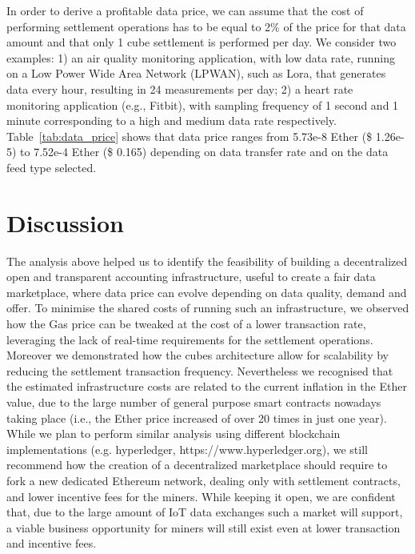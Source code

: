In order to derive a profitable data price, we can assume that the cost of performing settlement operations has to be equal to 2\% of the price for that data amount and that only 1 cube settlement is performed per day. We consider two examples: 1) an air quality monitoring application, with low data rate, running on a Low Power Wide Area Network (LPWAN), such as Lora, that generates data every hour, resulting in 24 measurements per day; 2) a heart rate monitoring application (e.g., Fitbit), with sampling frequency of 1 second and 1 minute corresponding to a high and medium data rate respectively.  
Table~\ref{tab:data_price} shows that data price ranges from 5.73e-8 Ether (\$ 1.26e-5) to 7.52e-4 Ether (\$ 0.165) depending on data transfer rate and on the data feed type selected. 

\section{Discussion}
\label{sec:discussion}
The analysis above helped us to identify the feasibility of building a decentralized open and transparent accounting infrastructure, useful to create a fair data marketplace, where data price can evolve depending on data quality, demand and offer. To minimise the shared costs of running such an infrastructure, we observed how the Gas price can be tweaked at the cost of a lower transaction rate, leveraging the lack of real-time requirements for the settlement operations. Moreover we demonstrated how the cubes architecture allow for scalability by reducing the settlement transaction frequency.
Nevertheless we recognised that the estimated infrastructure costs are related to the current inflation in the Ether value, due to the large number of general purpose smart contracts nowadays taking place (i.e., the Ether price increased of over 20 times in just one year). While we plan to perform similar analysis using different blockchain implementations (e.g. hyperledger, https://www.hyperledger.org), we still recommend how the creation of a decentralized marketplace should require to fork a new dedicated Ethereum network, dealing only with settlement contracts, and lower incentive fees for the miners. While keeping it open, we are confident that, due to the large amount of IoT data exchanges such a market will support, a viable business opportunity for miners will still exist even at lower transaction and incentive fees.

